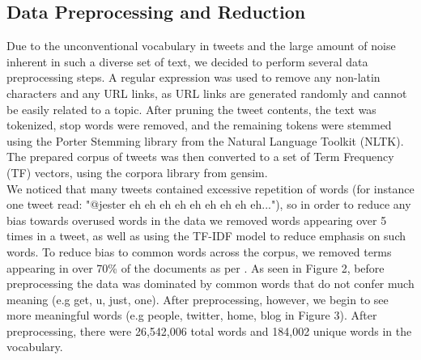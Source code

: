 \documentclass{acm_proc_article-sp}
\begin{document}
\subsection{Data Preprocessing and Reduction}
\hspace*{5mm}Due to the unconventional vocabulary in tweets and the large amount of noise inherent in such a diverse set of text, we decided to perform several data preprocessing steps. A regular expression was used to remove any non-latin characters and any URL links, as URL links are generated randomly and cannot be easily related to a topic. After pruning the tweet contents, the text was tokenized, stop words were removed, and the remaining tokens were stemmed using the Porter Stemming library from the Natural Language Toolkit (NLTK). The prepared corpus of tweets was then converted to a set of Term Frequency (TF) vectors, using the corpora library from gensim. \\
We noticed that many tweets contained excessive repetition of words (for instance one tweet read: "@jester eh eh eh eh eh eh eh eh eh..."), so in order to reduce any bias towards overused words in the data we removed words appearing over 5 times in a tweet, as well as using the TF-IDF model to reduce emphasis on such words. To reduce bias to common words across the corpus, we removed terms appearing in over 70\% of the documents as per \cite{zhao2011comparing}. As seen in Figure 2, before preprocessing the data was dominated by common words that do not confer much meaning (e.g get, u, just, one). After preprocessing, however, we begin to see more meaningful words (e.g people, twitter, home, blog in Figure 3). After preprocessing, there were 26,542,006 total words and 184,002 unique words in the vocabulary.\\
\end{document}
